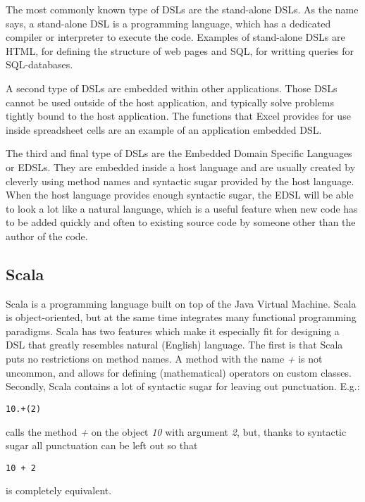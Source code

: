 The most commonly known type of DSLs are the stand-alone DSLs. As the name says, a stand-alone DSL is a programming language, which has a dedicated compiler or interpreter to execute the code. Examples of stand-alone DSLs are HTML, for defining the structure of web pages and SQL, for writting queries for SQL-databases.

A second type of DSLs are embedded within other applications. Those DSLs cannot be used outside of the host application, and typically solve problems tightly bound to the host application. The functions that Excel provides for use inside spreadsheet cells are an example of an application embedded DSL.

The third and final type of DSLs are the Embedded Domain Specific Languages or EDSLs. They are embedded inside a host language and are usually created by cleverly using method names and syntactic sugar provided by the host language. When the host language provides enough syntactic sugar, the EDSL will be able to look a lot like a natural language, which is a useful feature when new code has to be added quickly and often to existing source code by someone other than the author of the code.
\subsection{Scala}
\label{Scala}
Scala is a programming language built on top of the Java Virtual Machine. Scala is object-oriented, but at the same time integrates many functional programming paradigms. Scala has two features which make it especially fit for designing a DSL that greatly resembles natural (English) language. The first is that Scala puts no restrictions on method names. A method with the name \textit{+} is not uncommon, and allows for defining (mathematical) operators on custom classes. Secondly, Scala contains a lot of syntactic sugar for leaving out punctuation. E.g.:
\begin{verbatim}
10.+(2)
\end{verbatim}
calls the method \textit{+} on the object \textit{10} with argument \textit{2}, but, thanks to syntactic sugar all punctuation can be left out so that
\begin{verbatim}
10 + 2
\end{verbatim}
is completely equivalent.
